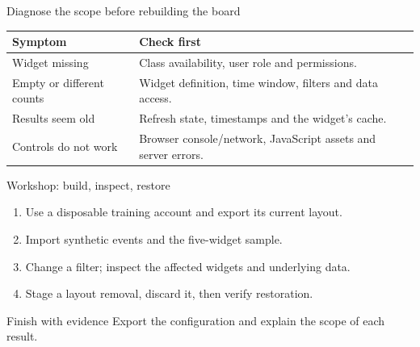 \begin{frame}{Diagnose the scope before rebuilding the board}
    \small
    \begin{tabular}{@{}P{3cm}P{7.2cm}@{}}
        \toprule
        Symptom & Check first \\
        \midrule
        Widget missing & Class availability, user role and permissions. \\
        Empty or different counts & Widget definition, time window, filters and data access. \\
        Results seem old & Refresh state, timestamps and the widget's cache. \\
        Controls do not work & Browser console/network, JavaScript assets and server errors. \\
        \bottomrule
    \end{tabular}
\end{frame}

\begin{frame}{Workshop: build, inspect, restore}
    \begin{enumerate}
        \item Use a disposable training account and export its current layout.
        \item Import synthetic events and the five-widget sample.
        \item Change a filter; inspect the affected widgets and underlying data.
        \item Stage a layout removal, discard it, then verify restoration.
    \end{enumerate}
    \begin{block}{Finish with evidence}
        Export the configuration and explain the scope of each result.
    \end{block}
\end{frame}

